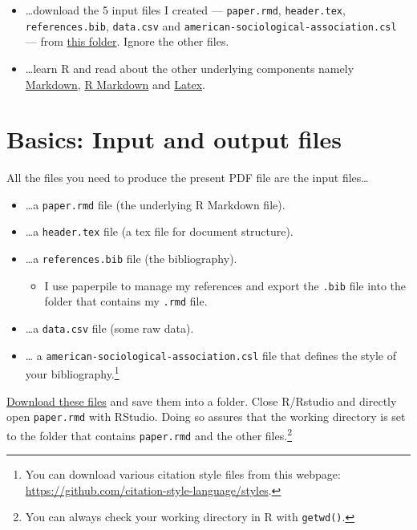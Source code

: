 \documentclass[
  12pt,
]{article}
\providecommand{\tightlist}{%
  \setlength{\itemsep}{0pt}\setlength{\parskip}{0pt}}
\begin{document}
\begin{itemize}
\item
  \ldots download the 5 input files I created --- \texttt{paper.rmd}, \texttt{header.tex}, \texttt{references.bib}, \texttt{data.csv} and \texttt{american-sociological-association.csl} --- from \href{https://drive.google.com/drive/folders/1zJP3cNPrHN-gj0rcmbHQgg-XA0hqDXdd?usp=sharing}{this folder}. Ignore the other files.
\item
  \ldots learn R and read about the other underlying components namely \href{https://en.wikipedia.org/wiki/Markdown}{Markdown}, \href{https://rmarkdown.rstudio.com/lesson-1.html}{R Markdown} and \href{https://en.wikipedia.org/wiki/LaTeX}{Latex}.
\end{itemize}

\hypertarget{basics-input-and-output-files}{%
\section{Basics: Input and output files}\label{basics-input-and-output-files}}

All the files you need to produce the present PDF file are the input files\ldots{}

\begin{itemize}
\tightlist
\item
  \ldots a \texttt{paper.rmd} file (the underlying R Markdown file).
\item
  \ldots a \texttt{header.tex} file (a tex file for document structure).
\item
  \ldots a \texttt{references.bib} file (the bibliography).

  \begin{itemize}
  \tightlist
  \item
    I use paperpile to manage my references and export the \texttt{.bib} file into the folder that contains my \texttt{.rmd} file.
  \end{itemize}
\item
  \ldots a \texttt{data.csv} file (some raw data).
\item
  \ldots{} a \texttt{american-sociological-association.csl} file that defines the style of your bibliography.\footnote{You can download various citation style files from this webpage: \url{https://github.com/citation-style-language/styles}.}
\end{itemize}

\href{https://drive.google.com/drive/folders/1zJP3cNPrHN-gj0rcmbHQgg-XA0hqDXdd?usp=sharing}{Download these files} and save them into a folder. Close R/Rstudio and directly open \texttt{paper.rmd} with RStudio. Doing so assures that the working directory is set to the folder that contains \texttt{paper.rmd} and the other files.\footnote{You can always check your working directory in R with \texttt{getwd()}.}
\end{document}
